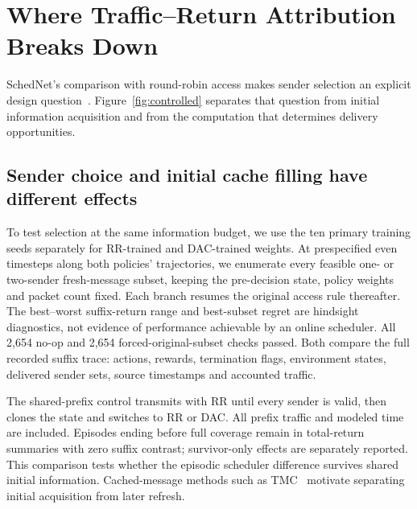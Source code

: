 \documentclass[10pt]{article}
\begin{document}
\section{Where Traffic--Return Attribution Breaks Down}
SchedNet's comparison with round-robin access makes sender selection an explicit design question~\citep{kim2019schedule}. Figure~\ref{fig:controlled} separates that question from initial information acquisition and from the computation that determines delivery opportunities.
\subsection{Sender choice and initial cache filling have different effects}
To test selection at the same information budget, we use the ten primary training seeds separately for RR-trained and DAC-trained weights. At prespecified even timesteps along both policies' trajectories, we enumerate every feasible one- or two-sender fresh-message subset, keeping the pre-decision state, policy weights and packet count fixed. Each branch resumes the original access rule thereafter. The best--worst suffix-return range and best-subset regret are hindsight diagnostics, not evidence of performance achievable by an online scheduler. All 2,654 no-op and 2,654 forced-original-subset checks passed. Both compare the full recorded suffix trace: actions, rewards, termination flags, environment states, delivered sender sets, source timestamps and accounted traffic.

The shared-prefix control transmits with RR until every sender is valid, then clones the state and switches to RR or DAC. All prefix traffic and modeled time are included. Episodes ending before full coverage remain in total-return summaries with zero suffix contrast; survivor-only effects are separately reported. This comparison tests whether the episodic scheduler difference survives shared initial information. Cached-message methods such as TMC~\citep{zhang2020succinct} motivate separating initial acquisition from later refresh.
\end{document}
